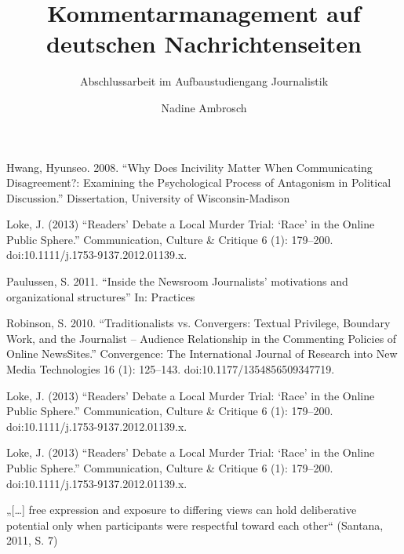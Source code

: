 \documentclass[12pt,parskip=full,ngerman]{scrreprt} %
\title{Kommentarmanagement auf deutschen Nachrichtenseiten}
\subtitle{Abschlussarbeit im Aufbaustudiengang Journalistik}
\author{Nadine Ambrosch}
\begin{document}
\begin{spacing}{1}
  \maketitle
\end{spacing}

\tableofcontents
\listoftables




















Hwang, Hyunseo. 2008. “Why Does Incivility Matter When Communicating Disagreement?:
Examining the Psychological Process of Antagonism in Political Discussion.” Dissertation,
University of Wisconsin-Madison

Loke, J. (2013) “Readers’ Debate a Local Murder Trial: ‘Race’ in the Online
Public Sphere.” Communication, Culture \& Critique 6 (1): 179–200.
doi:10.1111/j.1753-9137.2012.01139.x.

Paulussen, S. 2011. ``Inside the Newsroom Journalists’ motivations and organizational structures'' In: Practices


Robinson, S. 2010. “Traditionalists vs. Convergers: Textual Privilege, Boundary Work, and the
Journalist – Audience Relationship in the Commenting Policies of Online NewsSites.”
Convergence: The International Journal of Research into New Media Technologies 16 (1):
125–143. doi:10.1177/1354856509347719.

Loke, J. (2013) “Readers’ Debate a Local Murder Trial: ‘Race’ in the Online
Public Sphere.” Communication, Culture \& Critique 6 (1): 179–200.
doi:10.1111/j.1753-9137.2012.01139.x.

Loke, J. (2013) “Readers’ Debate a Local Murder Trial: ‘Race’ in the Online
Public Sphere.” Communication, Culture \& Critique 6 (1): 179–200.
doi:10.1111/j.1753-9137.2012.01139.x.




„[\ldots] free expression and exposure to differing views can hold deliberative
potential only when participants were respectful toward each other“ (Santana,
2011, S. 7)
\end{document}
